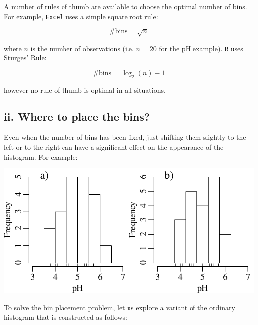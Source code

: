 A number of rules of thumb are available to choose the optimal number
of bins. For example, \texttt{Excel} uses a simple square root rule:

\begin{equation}
  \mbox{\#{bins} = } \sqrt{n}
\end{equation}

\noindent where $n$ is the number of observations (i.e. $n = 20$ for
the pH example). \texttt{R} uses Sturges' Rule:

\begin{equation}
  \mbox{\#{bins} = } \log_2(n) - 1
\end{equation}

\noindent however no rule of thumb is optimal in all situations.

\subsection*{ii. Where to place the bins?}

Even when the number of bins has been fixed, just shifting them
slightly to the left or to the right can have a significant effect on
the appearance of the histogram. For example:

\noindent\begin{minipage}[t][][b]{.5\textwidth}
  \includegraphics[width=\textwidth]{../figures/binpos.pdf}\\
\end{minipage}
\begin{minipage}[t][][t]{.5\textwidth}
  \label{fig:binpos}
\end{minipage}
  
To solve the bin placement problem, let us explore a variant of the
ordinary histogram that is constructed as follows:

